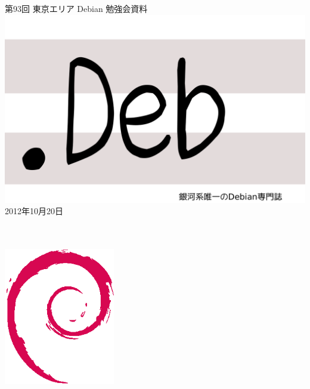 \documentclass[mingoth,a4paper]{jsarticle}
\newcommand{\debmtgyear}{2012}
\newcommand{\debmtgmonth}{10}
\newcommand{\debmtgdate}{20}
\newcommand{\debmtgnumber}{93}
\begin{document}
\begin{titlepage}
\thispagestyle{empty}

\vspace*{-2cm}
第\debmtgnumber{}回 東京エリア Debian 勉強会資料\\
\hspace*{-2cm}
\includegraphics{image2012-natsu/dotdeb.pdf}\\
\hfill{}\debmtgyear{}年\debmtgmonth{}月\debmtgdate{}日

\\
\\

\vspace*{-2cm}
\hfill{}\includegraphics[height=6cm]{image200502/openlogo-nd.eps}
\end{titlepage}

\end{document}
